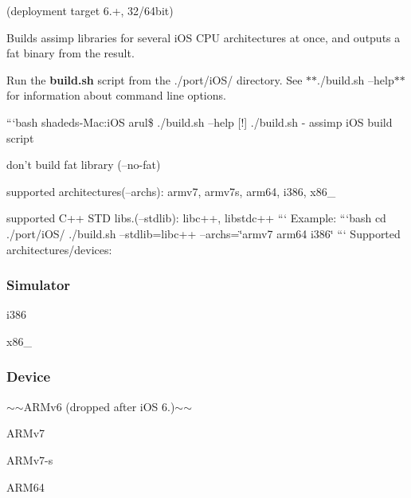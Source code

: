 (deployment target 6.+, 32/64bit)

Builds assimp libraries for several i\+O\+S C\+P\+U architectures at once, and outputs a fat binary from the result.

Run the {\bfseries build.\+sh} script from the {\ttfamily ./port/i\+O\+S/} directory. See $\ast$$\ast$./build.sh --help$\ast$$\ast$ for information about command line options.

```bash shadeds-\/\+Mac\+:i\+O\+S arul\$ ./build.sh --help \mbox{[}!\mbox{]} ./build.sh -\/ assimp i\+O\+S build script
\begin{DoxyItemize}
\item don't build fat library (--no-\/fat)
\item supported architectures(--archs)\+: armv7, armv7s, arm64, i386, x86\+\_
\item supported C++ S\+T\+D libs.(--stdlib)\+: libc++, libstdc++ ``` Example\+: ```bash cd ./port/i\+O\+S/ ./build.sh --stdlib=libc++ --archs=\char`\"{}armv7 arm64 i386\char`\"{} ``` Supported architectures/devices\+:
\end{DoxyItemize}

\subsubsection*{Simulator}


\begin{DoxyItemize}
\item i386
\item x86\+\_
\end{DoxyItemize}

\subsubsection*{Device}


\begin{DoxyItemize}
\item $\sim$$\sim$\+A\+R\+Mv6 (dropped after i\+O\+S 6.)$\sim$$\sim$
\item A\+R\+Mv7
\item A\+R\+Mv7-\/s
\item A\+R\+M64 
\end{DoxyItemize}